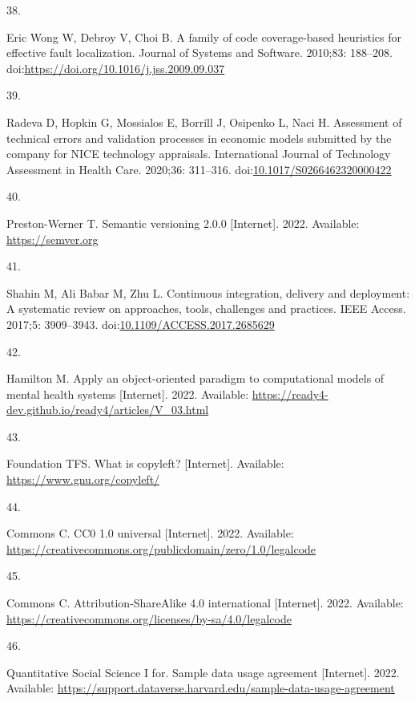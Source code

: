 \documentclass[
]{article}
\newlength{\cslhangindent}
\newlength{\csllabelwidth}
\newlength{\cslentryspacingunit} %
\newenvironment{CSLReferences}[2] %
 {%
  \setlength{\parindent}{0pt}
  \ifodd #1
  \let\oldpar\par
  \def\par{\hangindent=\cslhangindent\oldpar}
  \fi
  \setlength{\parskip}{#2\cslentryspacingunit}
 }%
 {}
\newcommand{\CSLLeftMargin}[1]{\parbox[t]{\csllabelwidth}{#1}}
\newcommand{\CSLRightInline}[1]{\parbox[t]{\linewidth - \csllabelwidth}{#1}\break}
\begin{document}
\begin{CSLReferences}{0}{0}
\leavevmode{}%
\CSLLeftMargin{38. }%
\CSLRightInline{Eric Wong W, Debroy V, Choi B. A family of code coverage-based heuristics for effective fault localization. Journal of Systems and Software. 2010;83: 188--208. doi:\url{https://doi.org/10.1016/j.jss.2009.09.037}}

\leavevmode{}%
\CSLLeftMargin{39. }%
\CSLRightInline{Radeva D, Hopkin G, Mossialos E, Borrill J, Osipenko L, Naci H. Assessment of technical errors and validation processes in economic models submitted by the company for NICE technology appraisals. International Journal of Technology Assessment in Health Care. 2020;36: 311--316. doi:\href{https://doi.org/10.1017/S0266462320000422}{10.1017/S0266462320000422}}

\leavevmode{}%
\CSLLeftMargin{40. }%
\CSLRightInline{Preston-Werner T. Semantic versioning 2.0.0 {[}Internet{]}. 2022. Available: \url{https://semver.org}}

\leavevmode{}%
\CSLLeftMargin{41. }%
\CSLRightInline{Shahin M, Ali Babar M, Zhu L. Continuous integration, delivery and deployment: A systematic review on approaches, tools, challenges and practices. IEEE Access. 2017;5: 3909--3943. doi:\href{https://doi.org/10.1109/ACCESS.2017.2685629}{10.1109/ACCESS.2017.2685629}}

\leavevmode{}%
\CSLLeftMargin{42. }%
\CSLRightInline{Hamilton M. Apply an object-oriented paradigm to computational models of mental health systems {[}Internet{]}. 2022. Available: \url{https://ready4-dev.github.io/ready4/articles/V_03.html}}

\leavevmode{}%
\CSLLeftMargin{43. }%
\CSLRightInline{Foundation TFS. What is copyleft? {[}Internet{]}. Available: \url{https://www.gnu.org/copyleft/}}

\leavevmode{}%
\CSLLeftMargin{44. }%
\CSLRightInline{Commons C. CC0 1.0 universal {[}Internet{]}. 2022. Available: \url{https://creativecommons.org/publicdomain/zero/1.0/legalcode}}

\leavevmode{}%
\CSLLeftMargin{45. }%
\CSLRightInline{Commons C. Attribution-ShareAlike 4.0 international {[}Internet{]}. 2022. Available: \url{https://creativecommons.org/licenses/by-sa/4.0/legalcode}}

\leavevmode{}%
\CSLLeftMargin{46. }%
\CSLRightInline{Quantitative Social Science I for. Sample data usage agreement {[}Internet{]}. 2022. Available: \url{https://support.dataverse.harvard.edu/sample-data-usage-agreement}}


\end{CSLReferences}
\end{document}
